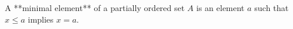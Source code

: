 A **minimal element** of a partially ordered set $A$ is an element $a$ such that $x \leq a$ implies $x = a$.
